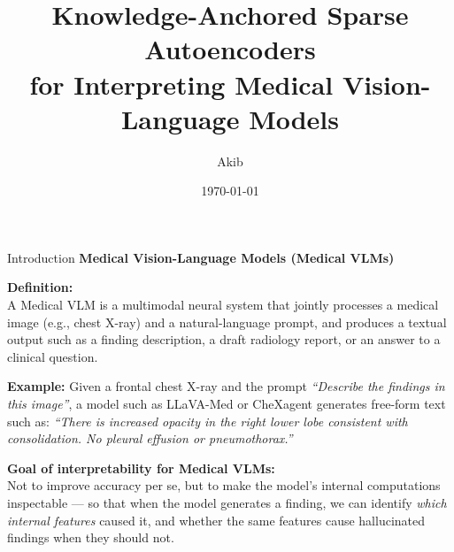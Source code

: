 \documentclass[aspectratio=169,11pt]{beamer}
\title[Interpreting Medical VLMs with SAEs]{Knowledge-Anchored Sparse Autoencoders \\ for Interpreting Medical Vision-Language Models}
\author{Akib}
\institute{Department of Computer Science and Engineering \\ Islamic University of Technology (IUT)}
\date{\today}
\begin{document}
\begin{frame}
    \titlepage
\end{frame}

\begin{frame}{Introduction}
    \textbf{Medical Vision-Language Models (Medical VLMs)}

    \vspace{0.4em}
    \textbf{Definition:} \\
    A Medical VLM is a multimodal neural system that jointly processes a medical image (e.g., chest X-ray) and a natural-language prompt, and produces a textual output such as a finding description, a draft radiology report, or an answer to a clinical question.

    \vspace{0.8em}
    \textbf{Example:} Given a frontal chest X-ray and the prompt \textit{``Describe the findings in this image''}, a model such as LLaVA-Med or CheXagent generates free-form text such as: \textit{``There is increased opacity in the right lower lobe consistent with consolidation. No pleural effusion or pneumothorax.''}

    \vspace{0.8em}
    \textbf{Goal of interpretability for Medical VLMs:} \\
    Not to improve accuracy per se, but to make the model's internal computations inspectable --- so that when the model generates a finding, we can identify \emph{which internal features} caused it, and whether the same features cause hallucinated findings when they should not.
\end{frame}
\end{document}
